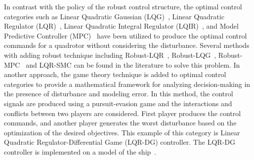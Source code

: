 \documentclass[3p]{elsarticle}
\begin{document}
In contrast with the policy of the robust control structure, the optimal control categories such as Linear Quadratic Gaussian (LQG)~\cite{7367782}, Linear Quadratic Regulator (LQR)~\cite{7064553_LQR}, Linear Quadratic Integral Regulator (LQIR)~\cite{article_LQIR}, and Model Predictive Controller (MPC)~\cite{SANTOS2022123, CAMARA20231} have been utilized to produce the optimal control commands for a quadrotor without considering the disturbance. Several methods with adding robust technique including Robust-LQR~\cite{robust_LQR}, Robust-LQG~\cite{XU202084}, Robust-MPC~\cite{YAN202335} and LQR-SMC can be found in the literature to solve this problem. In another approach, the game theory technique is added to optimal control categories to provide a mathematical framework for analyzing decision-making in the presence of disturbance and modeling error. In this method, the control signals are produced using a pursuit-evasion game and the interactions and conflicts between two players are considered. First player produces the control commands, and another player generates the worst disturbance based on the optimization of the desired objectives. This example of this category is Linear Quadratic Regulator-Differential Game (LQR-DG) controller. The LQR-DG controller is implemented on a model of the ship~\cite{6957349}.



















































\end{document}
